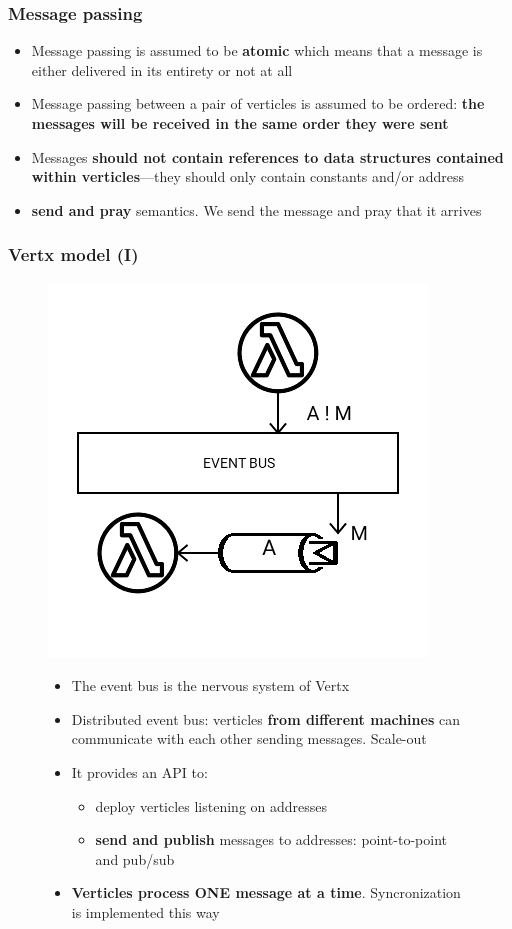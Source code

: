 \documentclass{beamer}
\begin{document}
\begin{frame}
\frametitle{Message passing}
\begin{itemize}
\item<1-> Message passing is assumed to be \textbf{atomic} which means that a message is either delivered in its entirety or not at all
\item<2-> Message passing between a pair of verticles is assumed to be ordered: \textbf{the messages will be received in the same order they were sent}
\item<3-> Messages \textbf{should not contain references to data structures contained within verticles}—they should only contain constants and/or address
\item<4->\textbf{send and pray} semantics. We send the message and pray that it arrives
\end{itemize}
\end{frame}

\begin{frame}
\frametitle{Vertx model (I)}
\begin{figure}
\includegraphics[scale=0.3]{images/vertx-model-1.png}
\begin{itemize}
\item<1-> The event bus  is the nervous system of Vertx
\item<2-> Distributed event bus: verticles \textbf{from different machines} can communicate with each other sending messages. Scale-out
\item<3-> It provides an API to:
\begin{itemize}
        \item<4-> deploy verticles listening on addresses
        \item<5-> \textbf{send and publish} messages to addresses: point-to-point and pub/sub 
\end{itemize}        
\item<6->  \textbf{Verticles process ONE message at a time}. Syncronization is implemented this way
\end{itemize}
\end{figure}
\end{frame}
\end{document}
